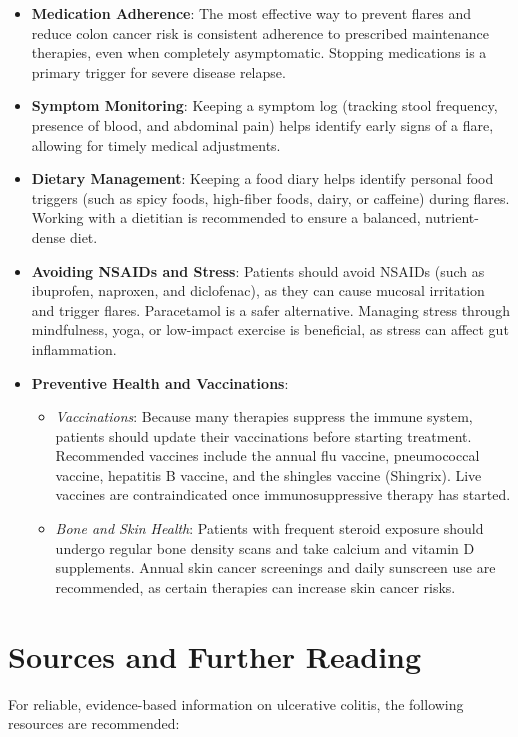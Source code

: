 \begin{itemize}
  \item \textbf{Medication Adherence}: The most effective way to prevent flares and reduce colon cancer risk is consistent adherence to prescribed maintenance therapies, even when completely asymptomatic. Stopping medications is a primary trigger for severe disease relapse.
  \item \textbf{Symptom Monitoring}: Keeping a symptom log (tracking stool frequency, presence of blood, and abdominal pain) helps identify early signs of a flare, allowing for timely medical adjustments.
  \item \textbf{Dietary Management}: Keeping a food diary helps identify personal food triggers (such as spicy foods, high-fiber foods, dairy, or caffeine) during flares. Working with a dietitian is recommended to ensure a balanced, nutrient-dense diet.
  \item \textbf{Avoiding NSAIDs and Stress}: Patients should avoid NSAIDs (such as ibuprofen, naproxen, and diclofenac), as they can cause mucosal irritation and trigger flares. Paracetamol is a safer alternative. Managing stress through mindfulness, yoga, or low-impact exercise is beneficial, as stress can affect gut inflammation.
  \item \textbf{Preventive Health and Vaccinations}:
  \begin{itemize}
    \item \textit{Vaccinations}: Because many therapies suppress the immune system, patients should update their vaccinations before starting treatment. Recommended vaccines include the annual flu vaccine, pneumococcal vaccine, hepatitis B vaccine, and the shingles vaccine (Shingrix). Live vaccines are contraindicated once immunosuppressive therapy has started.
    \item \textit{Bone and Skin Health}: Patients with frequent steroid exposure should undergo regular bone density scans and take calcium and vitamin D supplements. Annual skin cancer screenings and daily sunscreen use are recommended, as certain therapies can increase skin cancer risks.
  \end{itemize}
\end{itemize}

\section*{Sources and Further Reading}
For reliable, evidence-based information on ulcerative colitis, the following resources are recommended:

